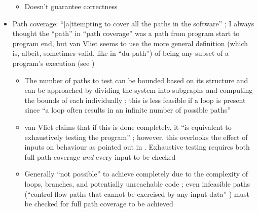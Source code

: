 \begin{itemize}
\begin{itemize}
                  \item Doesn't guarantee correctness
                        \citep[p.~421]{vanVliet2000}
            \end{itemize}
      \item Path coverage: ``[a]ttempting to cover all the paths in the
            software'' \citep[p.~119]{Patton2006};
            I always thought the ``path'' in ``path coverage'' was
            a path from program start to program end, but van
            Vliet seems to use the more general definition (which
            is, albeit, sometimes valid, like in ``du-path'') of
            being any subset of a program's execution (see
            \citep[p.~420]{vanVliet2000})
            \begin{itemize}
                  \item The number of paths to test can be bounded based on its
                        structure and can be approached by dividing the system
                        into subgraphs and computing the bounds of each
                        individually \citep[pp.~471-473]{PetersAndPedrycz2000};
                        this is less feasible if a loop is present
                        \citep[pp.~473-476]{PetersAndPedrycz2000} since ``a loop
                        often results in an infinite number of possible paths''
                        \citep[p.~421]{vanVliet2000}
                  \item van Vliet claims that if this is done completely, it
                        ``is equivalent to exhaustively testing the program''
                        \citep[p.~421]{vanVliet2000};
                        however, this overlooks the effect of inputs on
                        behaviour as pointed out in
                        \citep[pp.~466-467]{PetersAndPedrycz2000}. Exhaustive
                        testing requires both full path coverage \emph{and}
                        every input to be checked
                  \item Generally ``not possible'' to achieve completely due to
                        the complexity of
                        loops, branches, and potentially unreachable code
                        \citep[p.~421]{vanVliet2000}; even infeasible
                        paths (``control flow paths that cannot be exercised by
                        any input data'' \citep[p.~5-5]{SWEBOK2024}) must be
                        checked for full path coverage to be achieved

\end{itemize}
\end{itemize}
